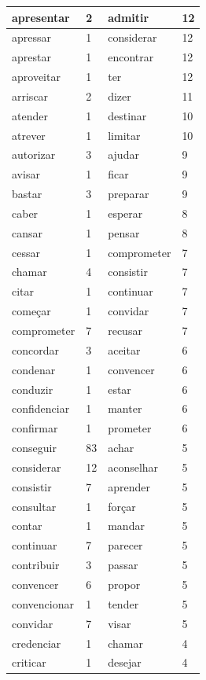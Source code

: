 \documentclass[output=paper,colorlinks,citecolor=brown]{langscibook}
\begin{document}
\begin{longtable}{ p{3cm} | p{1cm} | p{3cm} | p{1cm} }
			apresentar & 2 & admitir & 12\\\hline
			apressar & 1 & considerar & 12\\\hline
			aprestar & 1 & encontrar & 12\\\hline
			aproveitar & 1 & ter & 12\\\hline
			arriscar & 2 & dizer & 11\\\hline
			atender & 1 & destinar & 10\\\hline
			atrever & 1 & limitar & 10\\\hline
			autorizar & 3 & ajudar & 9\\\hline
			avisar & 1 & ficar & 9\\\hline
			bastar & 3 & preparar & 9\\\hline
			caber & 1 & esperar & 8\\\hline
			cansar & 1 & pensar & 8\\\hline
			cessar & 1 & comprometer & 7\\\hline
			chamar & 4 & consistir & 7\\\hline
			citar & 1 & continuar & 7\\\hline
			começar & 1 & convidar & 7\\\hline
			comprometer & 7 & recusar & 7\\\hline
			concordar & 3 & aceitar & 6\\\hline
			condenar & 1 & convencer & 6\\\hline
			conduzir & 1 & estar & 6\\\hline
			confidenciar & 1 & manter & 6\\\hline
			confirmar & 1 & prometer & 6\\\hline
			conseguir & 83 & achar & 5\\\hline
			considerar & 12 & aconselhar & 5\\\hline
			consistir & 7 & aprender & 5\\\hline
			consultar & 1 & forçar & 5\\\hline
			contar & 1 & mandar & 5\\\hline
			continuar & 7 & parecer & 5\\\hline
			contribuir & 3 & passar & 5\\\hline
			convencer & 6 & propor & 5\\\hline
			convencionar & 1 & tender & 5\\\hline
			convidar & 7 & visar & 5\\\hline
			credenciar & 1 & chamar & 4\\\hline
			criticar & 1 & desejar & 4\\\hline

\end{longtable}
\end{document}
